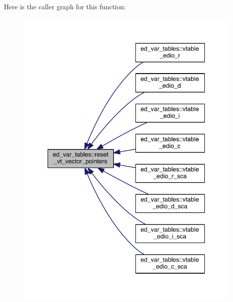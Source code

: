 Here is the caller graph for this function\+:\nopagebreak
\begin{figure}[H]
\begin{center}
\leavevmode
\includegraphics[width=335pt]{namespaceed__var__tables_aed76c1293872b5f6cf4c39c0747d2bb4_icgraph}
\end{center}
\end{figure}


\hypertarget{namespaceed__var__tables_aaac5e1ef08aa7ccf93e7916d12ce9c37}{}

